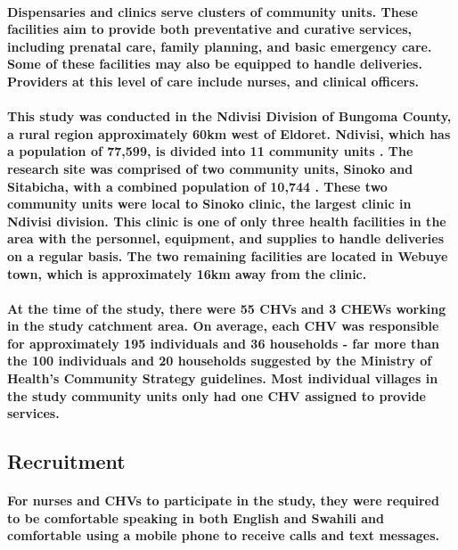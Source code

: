 \paragraph{Dispensaries and clinics serve clusters of community units. These facilities aim to provide both preventative and curative services, including prenatal care, family planning, and basic emergency care. Some of these facilities may also be equipped to handle deliveries. Providers at this level of care include nurses, and clinical officers.}

\paragraph{This study was conducted in the Ndivisi Division of Bungoma County, a rural region approximately 60km west of Eldoret. Ndivisi, which has a population of 77,599, is divided into 11 community units \citep{Census2009}. The research site was comprised of two community units, Sinoko and Sitabicha, with a combined population of 10,744 \citep{Census2009}. These two community units were local to Sinoko clinic, the largest clinic in Ndivisi division. This clinic is one of only three health facilities in the area with the personnel, equipment, and supplies to handle deliveries on a regular basis. The two remaining facilities are located in Webuye town, which is approximately 16km away from the clinic.}

\paragraph{At the time of the study, there were 55 CHVs and 3 CHEWs working in the study catchment area. On average, each CHV was responsible for approximately 195 individuals and 36 households - far more than the 100 individuals and 20 households suggested by the Ministry of Health's Community Strategy guidelines. Most individual villages in the study community units only had one CHV assigned to provide services.}


\subsection{Recruitment}
\paragraph{For nurses and CHVs to participate in the study, they were required to be comfortable speaking in both English and Swahili and comfortable using a mobile phone to receive calls and text messages.}

